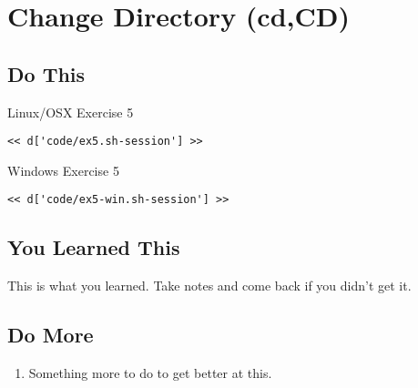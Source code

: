\chapter{Change Directory (cd,CD)}

\section{Do This}

\begin{code}{Linux/OSX Exercise 5}
\begin{Verbatim}
<< d['code/ex5.sh-session'] >>
\end{Verbatim}
\end{code}

\begin{code}{Windows Exercise 5}
\begin{Verbatim}
<< d['code/ex5-win.sh-session'] >>
\end{Verbatim}
\end{code}

\section{You Learned This}

This is what you learned.  Take notes and come back if you didn't get it.

\section{Do More}

\begin{enumerate}
\item Something more to do to get better at this.
\end{enumerate}

